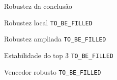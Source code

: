 
\begin{frame}{Robustez da conclusão}

    \begin{block}{Robustez local}
        \texttt{TO\_BE\_FILLED}
    \end{block}

    \vspace{0.2cm}

    \begin{block}{Robustez ampliada}
        \texttt{TO\_BE\_FILLED}
    \end{block}

    \vspace{0.2cm}

    \begin{block}{Estabilidade do top 3}
        \texttt{TO\_BE\_FILLED}
    \end{block}

    \vspace{0.2cm}

    \begin{block}{Vencedor robusto}
        \texttt{TO\_BE\_FILLED}
    \end{block}

\end{frame}



